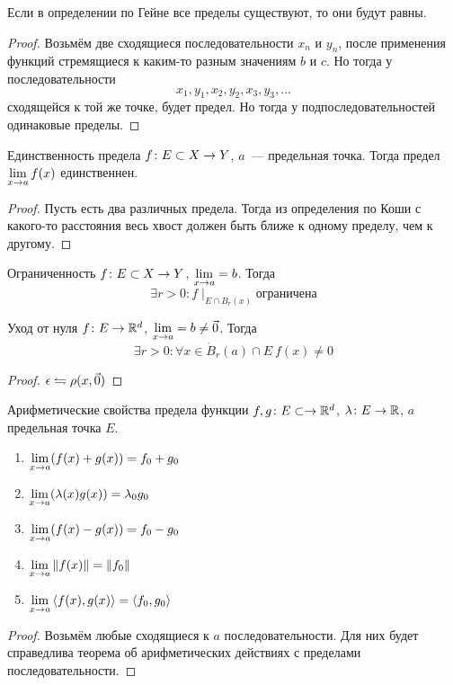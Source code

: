 \begin{Rem}
Если в определении по Гейне все пределы существуют, то они будут равны.
\end{Rem}
\begin{proof}
Возьмём две сходящиеся последовательности $x_n$ и $y_n$, после применения функций стремящиеся к каким-то разным значениям $b$ и $c$. Но тогда
у последовательности 
$$x_1, y_1, x_2, y_2, x_3, y_3, \ldots$$
сходящейся к той же точке, будет предел. Но тогда у подпоследовательностей одинаковые пределы.
\end{proof}

\begin{assertion}{Единственность предела}
$f\colon E \subset X \rightarrow Y$, $a$~--- предельная точка. Тогда предел $\lim\limits_{x\rightarrow a} f(x)$ единственнен.
\end{assertion}
\begin{proof}
Пусть есть два различных предела. Тогда из определения по Коши с какого-то расстояния весь хвост должен быть ближе к одному пределу, чем к другому.
\end{proof}

\begin{theorem}{Ограниченность}
$f\colon E \subset X \rightarrow Y$, $\lim\limits_{x\rightarrow a} = b$. Тогда 
$$\exists r>0\colon f \mid_{E \cap B_r(x)}\text{ограничена}$$
\end{theorem}

\begin{theorem}{Уход от нуля}
$f\colon E \rightarrow \mathbb{R}^d$, $\lim\limits_{x\rightarrow a} = b \ne \vec 0$. Тогда
$$\exists r>0\colon \forall x \in \dot B_r(a) \cap E\: f(x) \ne 0$$
\end{theorem}
\begin{proof}
$\epsilon \leftrightharpoons \rho(x, \vec 0)$
\end{proof}

\begin{theorem}{Арифметические свойства предела функции}
$f, g\colon E \subset \rightarrow \mathbb{R}^d$, $\lambda\colon E \rightarrow \mathbb{R}$, $a$ предельная точка $E$.
\begin{enumerate}
\item $\lim\limits_{x\rightarrow a} (f(x) + g(x)) = f_0 + g_0$
\item $\lim\limits_{x\rightarrow a} (\lambda(x)  g(x)) = \lambda_0 g_0$
\item $\lim\limits_{x\rightarrow a} (f(x) - g(x)) = f_0 - g_0$
\item $\lim\limits_{x\rightarrow a} \left\|f(x)\right\| = \left\|f_0\right\|$
\item $\lim\limits_{x\rightarrow a} \left<f(x), g(x)\right> = \left<f_0, g_0\right>$
\end{enumerate}
\end{theorem}
\begin{proof}
Возьмём любые сходящиеся к $a$ последовательности. Для них будет справедлива теорема об арифметических действиях с пределами последовательности.
\end{proof}

